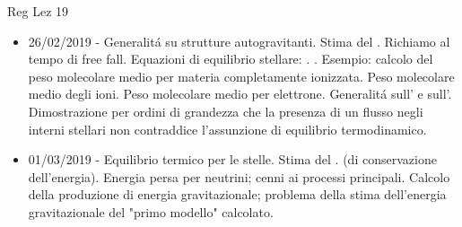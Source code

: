 \begin{frame}[allowframebreaks]{Reg Lez 19}
\begin{itemize}
\item 26/02/2019 - Generalit\'a su strutture autogravitanti. Stima del . Richiamo al tempo di free fall. Equazioni di equilibrio stellare: . . Esempio: calcolo del peso molecolare medio per materia completamente ionizzata. Peso molecolare medio degli ioni. Peso molecolare medio per elettrone. Generalit\'a sull' e sull'. Dimostrazione per ordini di grandezza che la presenza di un flusso negli interni stellari non contraddice l'assunzione di equilibrio termodinamico. 
\item 01/03/2019 - Equilibrio termico per le stelle. Stima del .  (di conservazione dell'energia). Energia persa per neutrini; cenni ai processi principali. Calcolo della produzione di energia gravitazionale; problema della stima dell'energia gravitazionale del "primo modello" calcolato.


\end{itemize}
\end{frame}
